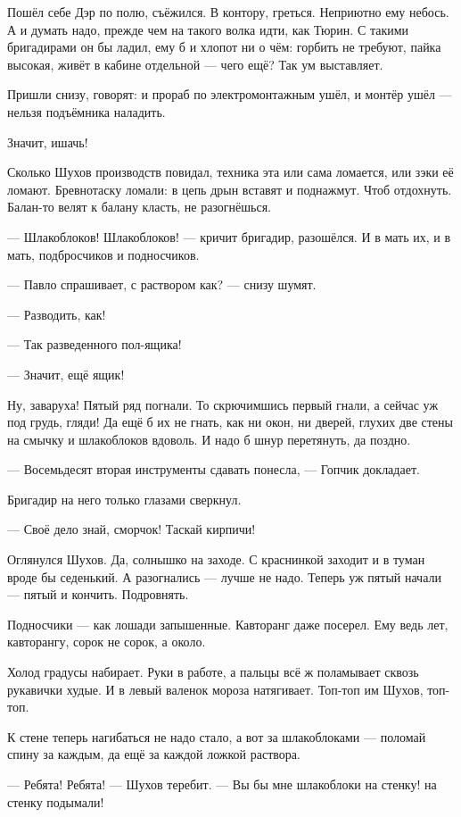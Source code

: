 Пошёл себе Дэр по полю, съёжился. В контору, греться. Неприютно ему небось. А и думать надо,
прежде чем на такого волка идти, как Тюрин. С такими бригадирами он бы ладил, ему б и хлопот ни
о чём: горбить не требуют, пайка высокая, живёт в кабине отдельной --- чего ещё? Так ум
выставляет.

Пришли снизу, говорят: и прораб по электромонтажным ушёл, и монтёр ушёл --- нельзя подъёмника
наладить.

Значит, ишачь!

Сколько Шухов производств повидал, техника эта или сама ломается, или зэки её ломают.
Бревнотаску ломали: в цепь дрын вставят и поднажмут. Чтоб отдохнуть. Балан-то велят к балану
класть, не разогнёшься.

--- Шлакоблоков! Шлакоблоков! --- кричит бригадир, разошёлся. И в мать их, и в мать, подбросчиков
и подносчиков.

--- Павло спрашивает, с раствором как? --- снизу шумят.

--- Разводить, как!

--- Так разведенного пол-ящика!

--- Значит, ещё ящик!

Ну, заваруха! Пятый ряд погнали. То скрючимшись первый гнали, а сейчас уж под грудь, гляди! Да
ещё б их не гнать, как ни окон, ни дверей, глухих две стены на смычку и шлакоблоков вдоволь. И
надо б шнур перетянуть, да поздно.

--- Восемьдесят вторая инструменты сдавать понесла, --- Гопчик докладает.

Бригадир на него только глазами сверкнул.

--- Своё дело знай, сморчок! Таскай кирпичи!

Оглянулся Шухов. Да, солнышко на заходе. С краснинкой заходит и в туман вроде бы седенький. А
разогнались --- лучше не надо. Теперь уж пятый начали --- пятый и кончить. Подровнять.

Подносчики --- как лошади запышенные. Кавторанг даже посерел. Ему ведь лет, кавторангу, сорок
не сорок, а около.

Холод градусы набирает. Руки в работе, а пальцы всё ж поламывает сквозь рукавички худые. И в
левый валенок мороза натягивает. Топ-топ им Шухов, топ-топ.

К стене теперь нагибаться не надо стало, а вот за шлакоблоками --- поломай спину за каждым, да
ещё за каждой ложкой раствора.

--- Ребята! Ребята! --- Шухов теребит. --- Вы бы мне шлакоблоки на стенку! на стенку подымали!

